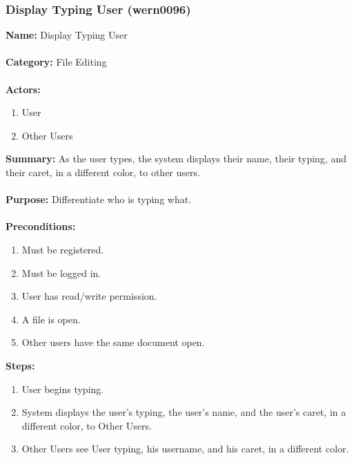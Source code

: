 \documentclass[11pt]{report}
\begin{document}
\newpage

\subsubsection{Display Typing User (wern0096)}
\begin{framed}
	\noindent\textbf{Name:} Display Typing User \\ \\
	\textbf{Category:} File Editing \\ \\
	\textbf{Actors:} 
	\begin{enumerate}
		\item User
		\item Other Users
	\end{enumerate}
	\textbf{Summary:} As the user types, the system displays their name, their typing, and their caret, in a different color, to other users. \\ \\
	\textbf{Purpose:} Differentiate who is typing what. \\ \\
	\textbf{Preconditions:} 
	\begin{enumerate}
		\item Must be registered.
		\item Must be logged in.
		\item User has read/write permission.
		\item A file is open.
		\item Other users have the same document open.
	\end{enumerate}
	\textbf{Steps:}
	\begin{enumerate}
		\item User begins typing.
		\item System displays the user's typing, the user's name, and the user's caret, in a different color, to Other Users.
		\item Other Users see User typing, his username, and his caret, in a different color.
	\end{enumerate}
\end{framed}

\newpage
\end{document}
